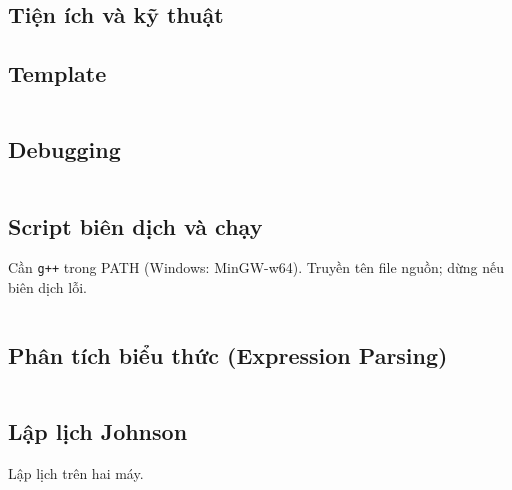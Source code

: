 \documentclass[landscape, 8pt, a4paper, oneside]{extarticle}
\begin{document}
\begin{multicols}{3}



















\section{Tiện ích và kỹ thuật}

\subsection{Template}
\inputminted[]{cpp}{source/template/template.cpp}

\subsection{Debugging}
\inputminted[]{cpp}{source/template/debug.cpp}

\subsection{Script biên dịch và chạy}
Cần \texttt{g++} trong PATH (Windows: MinGW-w64). Truyền tên file nguồn; dừng nếu biên dịch lỗi.
\inputminted[]{}{source/pseudocode/compile_scripts.txt}

\subsection{Phân tích biểu thức (Expression Parsing)}
\inputminted[]{cpp}{source/cpp/utility/expression.cpp}

\subsection{Lập lịch Johnson}
Lập lịch trên hai máy.
\inputminted[]{cpp}{source/cpp/utility/johnson.cpp}




\end{multicols}
\end{document}
